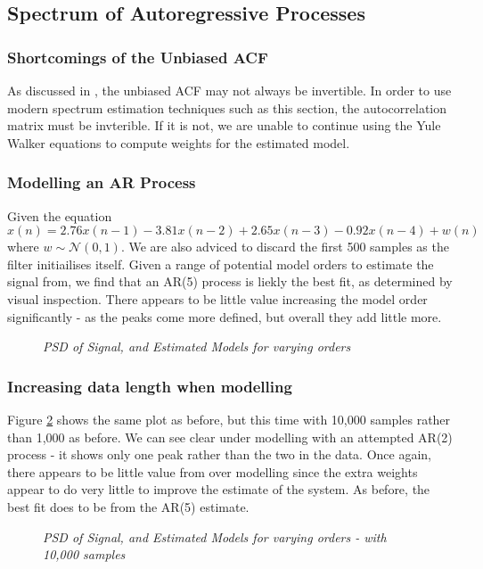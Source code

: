 \documentclass[./main.tex]{subfiles}
\begin{document}
\subsection{Spectrum of Autoregressive Processes}

\subsubsection{Shortcomings of the Unbiased ACF}
As discussed in \cite{Mandic2014}, the unbiased ACF may not always be invertible. In order to use modern spectrum estimation techniques such as this section, the autocorrelation matrix must be invterible. If it is not, we are unable to continue using the Yule Walker equations to compute weights for the estimated model.

\subsubsection{Modelling an AR Process}

Given the equation $ x(n) = 2.76x(n-1) -3.81x(n-2) + 2.65x(n-3) - 0.92x(n-4) + w(n) $ where $ w \sim \mathcal{N} (0, 1)  $. We are also adviced to discard the first 500 samples as the filter initiailises itself. Given a range of potential model orders to estimate the signal from, we find that an AR(5) process is liekly the best fit, as determined by visual inspection. There appears to be little value increasing the model order significantly - as the peaks come more defined, but overall they add little more.

\begin{figure}[h]
	\centering 
	\resizebox{\textwidth}{!}{}
	\caption{\textit{PSD of Signal, and Estimated Models for varying orders}}
	\label{fig:2_2_b}
\end{figure}


\subsubsection{Increasing data length when modelling}

Figure \ref{fig:2_2_c} shows the same plot as before, but this time with 10,000 samples rather than 1,000 as before. We can see clear under modelling with an attempted AR(2) process - it shows only one peak rather than the two in the data. Once again, there appears to be little value from over modelling since the extra weights appear to do very little to improve the estimate of the system. As before, the best fit does to be from the AR(5) estimate.

\begin{figure}[h]
	\centering 
	\resizebox{\textwidth}{!}{}
	\caption{\textit{PSD of Signal, and Estimated Models for varying orders - with 10,000 samples}}
	\label{fig:2_2_c}
\end{figure}
\end{document}
